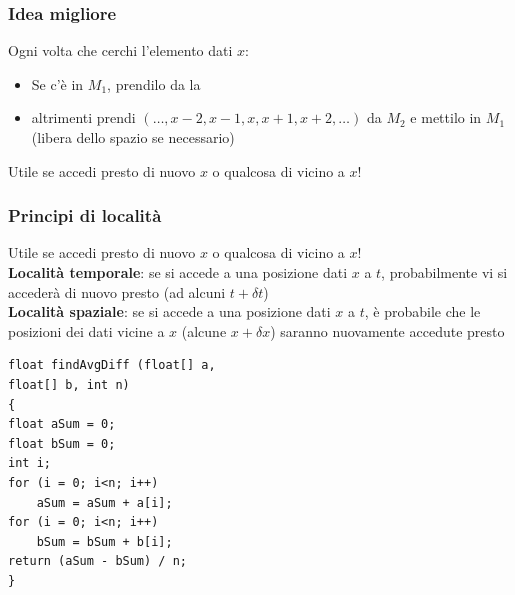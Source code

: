 \documentclass[12pt,a4paper]{article}
\begin{document}
\subsubsection{Idea migliore}
Ogni volta che cerchi l'elemento dati $x$:
\begin{itemize}
\item Se c'è in $M_1$, prendilo da la
\item altrimenti prendi $(\dots, x-2,x-1,x,x+1,x+2,\dots)$ da $M_2$ e mettilo in $M_1$ (libera dello spazio se necessario)
\end{itemize}
Utile se accedi presto di nuovo $x$ o qualcosa di vicino a $x$!

\subsubsection{Principi di località}
Utile se accedi presto di nuovo $x$ o qualcosa di vicino a $x$!\\
\textbf{Località temporale}: se si accede a una posizione dati $x$ a $t$, probabilmente vi si accederà di nuovo presto (ad alcuni $t + \delta t$)\\
\textbf{Località spaziale}: se si accede a una posizione dati $x$ a $t$, è probabile che le posizioni dei dati vicine a $x$ (alcune $x + \delta x$) saranno nuovamente accedute presto\\
\begin{minipage}{.45\linewidth}
\begin{verbatim}
float findAvgDiff (float[] a, 
float[] b, int n)
{
float aSum = 0;
float bSum = 0;
int i;
for (i = 0; i<n; i++)
    aSum = aSum + a[i];
for (i = 0; i<n; i++)
    bSum = bSum + b[i];
return (aSum - bSum) / n;
}
\end{verbatim}
\end{minipage}
\end{document}
